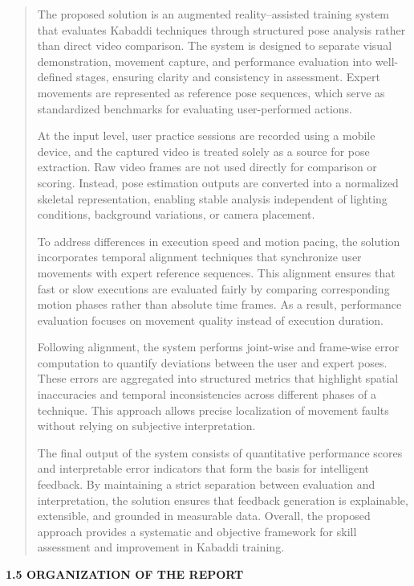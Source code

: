 \documentclass[
]{article}
\begin{document}
\begin{quote}
The proposed solution is an augmented reality--assisted training system
that evaluates Kabaddi techniques through structured pose analysis
rather than direct video comparison. The system is designed to separate
visual demonstration, movement capture, and performance evaluation into
well-defined stages, ensuring clarity and consistency in assessment.
Expert movements are represented as reference pose sequences, which
serve as standardized benchmarks for evaluating user-performed actions.

At the input level, user practice sessions are recorded using a mobile
device, and the captured video is treated solely as a source for pose
extraction. Raw video frames are not used directly for comparison or
scoring. Instead, pose estimation outputs are converted into a
normalized skeletal representation, enabling stable analysis independent
of lighting conditions, background variations, or camera placement.

To address differences in execution speed and motion pacing, the
solution incorporates temporal alignment techniques that synchronize
user movements with expert reference sequences. This alignment ensures
that fast or slow executions are evaluated fairly by comparing
corresponding motion phases rather than absolute time frames. As a
result, performance evaluation focuses on movement quality instead of
execution duration.

Following alignment, the system performs joint-wise and frame-wise error
computation to quantify deviations between the user and expert poses.
These errors are aggregated into structured metrics that highlight
spatial inaccuracies and temporal inconsistencies across different
phases of a technique. This approach allows precise localization of
movement faults without relying on subjective interpretation.

The final output of the system consists of quantitative performance
scores and interpretable error indicators that form the basis for
intelligent feedback. By maintaining a strict separation between
evaluation and interpretation, the solution ensures that feedback
generation is explainable, extensible, and grounded in measurable data.
Overall, the proposed approach provides a systematic and objective
framework for skill assessment and improvement in Kabaddi training.
\end{quote}

\textbf{1.5 ORGANIZATION OF THE REPORT}
\end{document}
